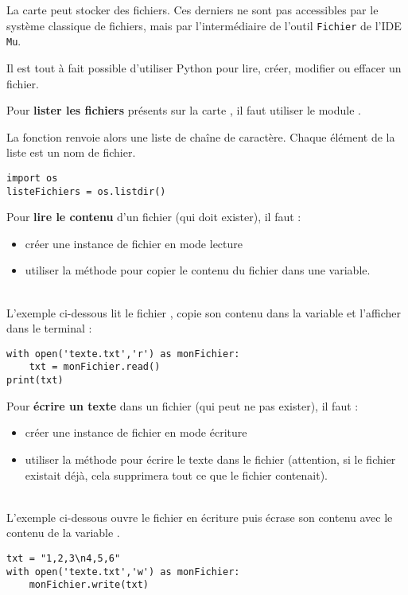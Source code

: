 La carte \mb peut stocker des fichiers. Ces derniers ne sont pas accessibles par le système classique de fichiers, mais par l'intermédiaire de l'outil \texttt{Fichier} de l'IDE \texttt{Mu}.

Il est tout à fait possible d'utiliser Python pour lire, créer, modifier ou effacer un fichier.

\begin{methode}
    Pour \textbf{lister les fichiers} présents sur la carte \mb, il faut utiliser le module .\par
    La fonction  renvoie alors une liste de chaîne de caractère. Chaque élément de la liste est un nom de fichier.
\begin{verbatim}
import os
listeFichiers = os.listdir()
\end{verbatim}
\end{methode}

\begin{methode}
    Pour \textbf{lire le contenu} d'un fichier (qui doit exister), il faut :
    \begin{itemize}
        \item créer une instance de fichier en mode lecture 
        \item utiliser la méthode  pour copier le contenu du fichier dans une variable.
    \end{itemize}~\\
    
    L'exemple ci-dessous lit le fichier , copie son contenu dans la variable  et l'afficher dans le terminal :
\begin{verbatim}
with open('texte.txt','r') as monFichier:
    txt = monFichier.read()
print(txt)
\end{verbatim}
\end{methode}

\begin{methode}
    Pour \textbf{écrire un texte} dans un fichier (qui peut ne pas exister), il faut :
    \begin{itemize}
        \item créer une instance de fichier en mode écriture 
        \item utiliser la méthode  pour écrire le texte dans le fichier (attention, si le fichier existait déjà, cela supprimera tout ce que le fichier contenait).
    \end{itemize}~\\
    
    L'exemple ci-dessous ouvre le fichier  en écriture puis écrase son contenu avec le contenu de la variable .
\begin{verbatim}
txt = "1,2,3\n4,5,6"
with open('texte.txt','w') as monFichier:
    monFichier.write(txt)
\end{verbatim}
\end{methode}

